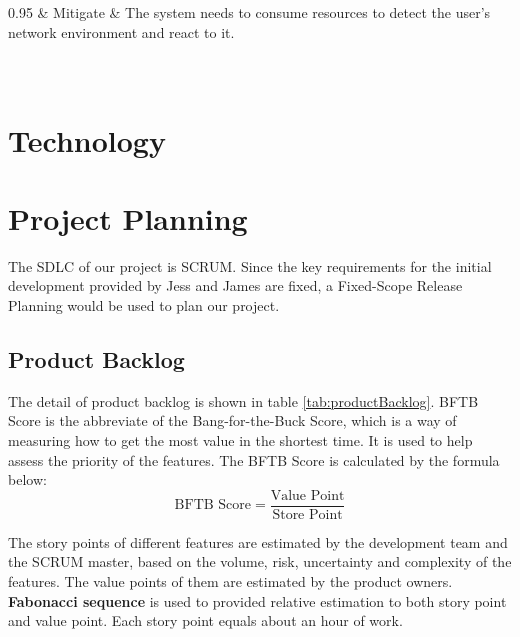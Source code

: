 \documentclass{report}
\begin{document}
\begin{tabularx}{0.95\linewidth}
  & Mitigate
  & The system needs to consume resources to detect the user's network environment and react to it.
  \\
  \\
  \bottomrule
  \\
  \caption{Risk Register}  
  \label{tab:riskRegister}
\end{tabularx}

\section{Technology}
\section{Project Planning}
The SDLC of our project is SCRUM. Since the key requirements for the initial development provided by Jess and James are fixed, a Fixed-Scope Release Planning would be used to plan our project.

\subsection{Product Backlog}
The detail of product backlog is shown in table \ref{tab:productBacklog}. BFTB Score is the abbreviate of the Bang-for-the-Buck Score, which is a way of measuring how to get the most value in the shortest time. It is used to help assess the priority of the features. The BFTB Score is calculated by the formula below:
$$
  \text{BFTB Score} = \frac{\text{Value Point}}{\text{Store Point}}
$$

The story points of different features are estimated by the development team and the SCRUM master, based on the volume, risk, uncertainty and complexity of the features. The value points of them are estimated by the product owners. \textbf{Fabonacci sequence} is used to provided relative estimation to both story point and value point. Each story point equals about an hour of work.
\end{document}
